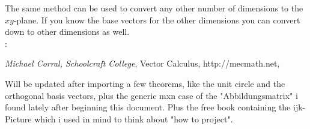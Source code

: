 \documentclass{article}
\begin{document}
The same method can be used to convert any other number of dimensions to the $xy$-plane.
If you know the base vectors for the other dimensions you can convert down to other dimensions as well.\\

:\\

\begin{thebibliography}
    \bibitem{[Corr09]} \textit{Michael Corral, Schoolcraft College},
		    Vector Calculus, http://mecmath.net,
		    
\end{thebibliography}


Will be updated after importing a few theorems, like the unit circle and the orthogonal basis vectors,
plus the generic mxn case of the "Abbildungsmatrix" i found lately after beginning this document.
Plus the free book containing the ijk-Picture which i used in mind to think about "how to project".\\

\makeindex
\printindex
\end{document}
